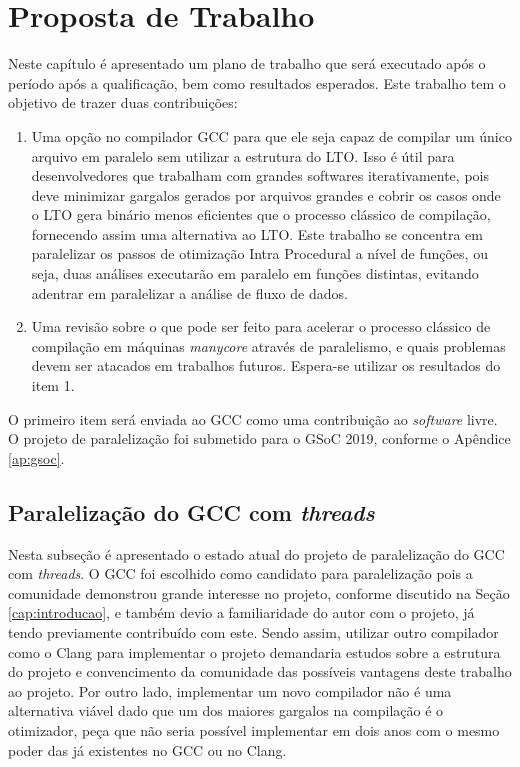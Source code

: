 \chapter{Proposta de Trabalho}
\label{chap:proposta}

Neste capítulo é apresentado um plano de trabalho que será executado
após o período após a qualificação, bem como resultados esperados.
Este trabalho tem o objetivo de trazer duas contribuições:
\begin{enumerate}
    \item Uma opção no compilador GCC para que ele seja
capaz de compilar um único arquivo em paralelo sem utilizar a
estrutura do LTO. Isso é útil para desenvolvedores que trabalham
com grandes softwares iterativamente, pois deve minimizar
gargalos gerados por arquivos grandes e cobrir os casos onde o LTO gera
binário menos eficientes que o processo clássico de compilação, fornecendo assim
uma alternativa ao LTO.
Este trabalho se concentra em paralelizar os passos de otimização Intra Procedural
a nível de funções, ou seja, duas análises executarão em paralelo em funções
distintas, evitando adentrar em paralelizar a análise de fluxo de dados.

    \item Uma revisão sobre o que pode ser feito para acelerar o
processo clássico de compilação em máquinas \textit{manycore} através
de paralelismo, e quais problemas devem ser atacados em trabalhos futuros.
Espera-se utilizar os resultados do item 1.
\end{enumerate}
O primeiro item será enviada ao GCC como uma contribuição
ao \textit{software} livre. O projeto de paralelização foi submetido para o GSoC 2019,
conforme o Apêndice \ref{ap:gsoc}.


\section{Paralelização do GCC com \textit{threads}}

Nesta subseção é apresentado o estado atual do projeto de paralelização
do GCC com \textit{threads}. O GCC foi escolhido como candidato para
paralelização pois a comunidade demonstrou grande interesse no projeto,
conforme discutido na Seção \ref{cap:introducao}, e também devio a familiaridade
do autor com o projeto, já tendo previamente contribuído com este. Sendo assim,
utilizar outro compilador como o Clang para implementar o projeto demandaria
estudos sobre a estrutura do projeto e convencimento da comunidade das possíveis
vantagens deste trabalho ao projeto. Por outro lado, implementar um
novo compilador não é uma alternativa viável dado que um dos maiores gargalos
na compilação é o otimizador, peça que não seria possível implementar em
dois anos com o mesmo poder das já existentes no GCC ou no Clang.

